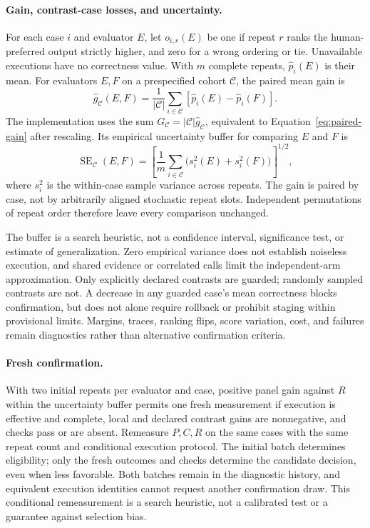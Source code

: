 \paragraph{Gain, contrast-case losses, and uncertainty.}
For each case $i$ and evaluator $E$, let $o_{i,r}(E)$ be one if repeat $r$ ranks the human-preferred output strictly higher, and zero for a wrong ordering or tie.
Unavailable executions have no correctness value.
With $m$ complete repeats, $\widehat p_i(E)$ is their mean.
For evaluators $E,F$ on a prespecified cohort $\mathcal C$, the paired mean gain is
\begin{equation}
 \widehat g_{\mathcal C}(E,F)
 =\frac{1}{|\mathcal C|}\sum_{i\in\mathcal C}
       [\widehat p_i(E)-\widehat p_i(F)].
 \label{eq:paired-gain}
\end{equation}
The implementation uses the sum $G_{\mathcal C}=|\mathcal C|\widehat g_{\mathcal C}$, equivalent to Equation~\ref{eq:paired-gain} after rescaling.
Its empirical uncertainty buffer for comparing $E$ and $F$ is
\begin{equation}
 \operatorname{SE}_{\mathcal C}(E,F)
 =\left[\frac{1}{m}\sum_{i\in\mathcal C}
   \bigl(s_i^2(E)+s_i^2(F)\bigr)\right]^{1/2},
 \label{eq:repeat-buffer}
\end{equation}
where $s_i^2$ is the within-case sample variance across repeats.
The gain is paired by case, not by arbitrarily aligned stochastic repeat slots.
Independent permutations of repeat order therefore leave every comparison unchanged.

The buffer is a search heuristic, not a confidence interval, significance test, or estimate of generalization.
Zero empirical variance does not establish noiseless execution, and shared evidence or correlated calls limit the independent-arm approximation.
Only explicitly declared contrasts are guarded; randomly sampled contrasts are not.
A decrease in any guarded case's mean correctness blocks confirmation, but does not alone require rollback or prohibit staging within provisional limits.
Margins, traces, ranking flips, score variation, cost, and failures remain diagnostics rather than alternative confirmation criteria.

\paragraph{Fresh confirmation.}
With two initial repeats per evaluator and case, positive panel gain against $R$ within the uncertainty buffer permits one fresh measurement if execution is effective and complete, local and declared contrast gains are nonnegative, and checks pass or are absent.
Remeasure $P,C,R$ on the same cases with the same repeat count and conditional execution protocol.
The initial batch determines eligibility; only the fresh outcomes and checks determine the candidate decision, even when less favorable.
Both batches remain in the diagnostic history, and equivalent execution identities cannot request another confirmation draw.
This conditional remeasurement is a search heuristic, not a calibrated test or a guarantee against selection bias.

